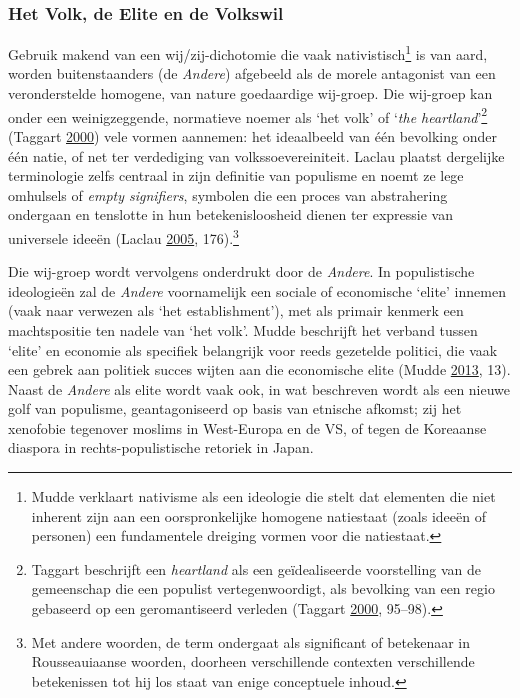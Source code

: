 \documentclass[10.5pt,dutch,]{article}
\begin{document}
\subsubsection{Het Volk, de Elite en de
Volkswil}\label{het-volk-de-elite-en-de-volkswil}

Gebruik makend van een wij/zij-dichotomie die vaak
nativistisch\footnote{Mudde verklaart nativisme als een ideologie die
  stelt dat elementen die niet inherent zijn aan een oorspronkelijke
  homogene natiestaat (zoals ideeën of personen) een fundamentele
  dreiging vormen voor die natiestaat.} is van aard, worden
buitenstaanders (de \emph{Andere}) afgebeeld als de morele antagonist
van een veronderstelde homogene, van nature goedaardige wij-groep. Die
wij-groep kan onder een weinigzeggende, normatieve noemer als `het volk'
of `\emph{the heartland}'\footnote{Taggart beschrijft een
  \emph{heartland} als een geïdealiseerde voorstelling van de
  gemeenschap die een populist vertegenwoordigt, als bevolking van een
  regio gebaseerd op een geromantiseerd verleden (Taggart
  \protect\hyperlink{ref-taggartux5fpopulismux5f2000}{2000}, 95--98).}
(Taggart \protect\hyperlink{ref-taggartux5fpopulismux5f2000}{2000}) vele
vormen aannemen: het ideaalbeeld van één bevolking onder één natie, of
net ter verdediging van volkssoevereiniteit. Laclau plaatst dergelijke
terminologie zelfs centraal in zijn definitie van populisme en noemt ze
lege omhulsels of \emph{empty signifiers}, symbolen die een proces van
abstrahering ondergaan en tenslotte in hun betekenisloosheid dienen ter
expressie van universele ideeën (Laclau
\protect\hyperlink{ref-laclauux5fpopulistux5f2005}{2005},
176).\footnote{Met andere woorden, de term ondergaat als significant of
  betekenaar in Rousseauiaanse woorden, doorheen verschillende contexten
  verschillende betekenissen tot hij los staat van enige conceptuele
  inhoud.}

Die wij-groep wordt vervolgens onderdrukt door de \emph{Andere}. In
populistische ideologieën zal de \emph{Andere} voornamelijk een sociale
of economische `elite' innemen (vaak naar verwezen als `het
establishment'), met als primair kenmerk een machtspositie ten nadele
van `het volk'. Mudde beschrijft het verband tussen `elite' en economie
als specifiek belangrijk voor reeds gezetelde politici, die vaak een
gebrek aan politiek succes wijten aan die economische elite (Mudde
\protect\hyperlink{ref-muddeux5foxfordux5f2013}{2013}, 13). Naast de
\emph{Andere} als elite wordt vaak ook, in wat beschreven wordt als een
nieuwe golf van populisme, geantagoniseerd op basis van etnische
afkomst; zij het xenofobie tegenover moslims in West-Europa en de VS, of
tegen de Koreaanse diaspora in rechts-populistische retoriek in Japan.
\end{document}
